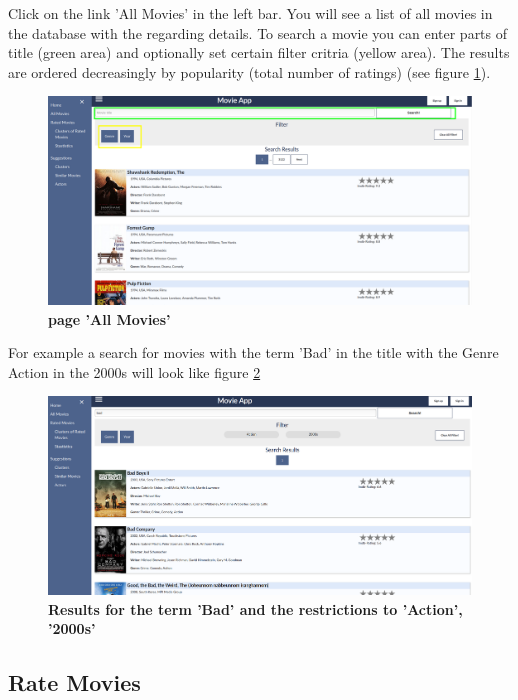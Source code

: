 \documentclass{article}
\begin{document}
Click on the link 'All Movies' in the left bar. You will see a list of all movies in the database with the regarding details.
To search a movie you can enter parts of title (green area) and optionally set certain filter critria (yellow area). The results are ordered decreasingly by popularity (total number of ratings) (see figure \ref{fig_all_movies}).\\
\begin{figure}[t!]
\includegraphics[scale=0.25]{screenshots_app/all_movies.png}
\caption{\textbf{page 'All Movies'}}\label{fig_all_movies}
\end{figure}
For example a search for movies with the term 'Bad' in the title with the Genre Action in the 2000s will look like figure \ref{fig_all_movies_ex1}\\
\begin{figure}[t!]
\includegraphics[scale=0.2]{screenshots_app/all_movies_ex1.png}
\caption{\textbf{Results for the term 'Bad' and the restrictions to 'Action', '2000s'}}\label{fig_all_movies_ex1}
\end{figure}


\subsection{Rate Movies}
\end{document}
